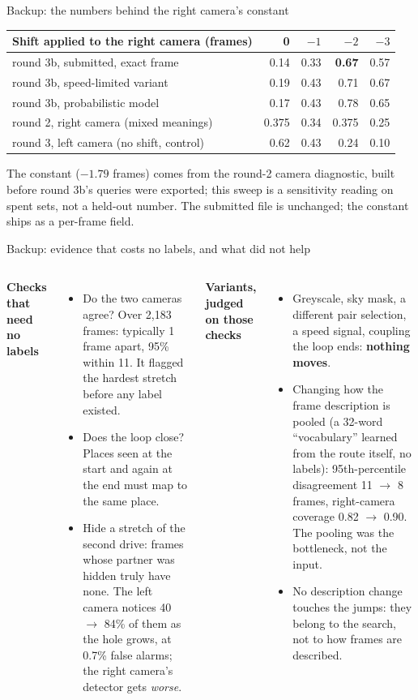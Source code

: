 \documentclass[10pt,aspectratio=169]{beamer}
\begin{document}
\begin{frame}{Backup: the numbers behind the right camera's constant}
\begin{center}\small
\begin{tabular}{lrrrr}
\toprule
Shift applied to the right camera (frames) & 0 & $-1$ & $-2$ & $-3$ \\
\midrule
round 3b, submitted, exact frame & 0.14 & 0.33 & \textbf{0.67} & 0.57 \\
round 3b, speed-limited variant & 0.19 & 0.43 & 0.71 & 0.67 \\
round 3b, probabilistic model & 0.17 & 0.43 & 0.78 & 0.65 \\
round 2, right camera (mixed meanings) & 0.375 & 0.34 & 0.375 & 0.25 \\
round 3, left camera (no shift, control) & 0.62 & 0.43 & 0.24 & 0.10 \\
\bottomrule
\end{tabular}
\end{center}
The constant ($-1.79$ frames) comes from the round-2 camera diagnostic, built before round 3b's queries were exported; this sweep is a sensitivity reading on spent sets, not a held-out number. The submitted file is unchanged; the constant ships as a per-frame field.
\end{frame}

\begin{frame}{Backup: evidence that costs no labels, and what did not help}
\begin{columns}[T]
\textbf{Checks that need no labels}
\begin{itemize}
  \item Do the two cameras agree? Over 2,183 frames: typically 1 frame apart, 95\% within 11. It flagged the hardest stretch before any label existed.
  \item Does the loop close? Places seen at the start and again at the end must map to the same place.
  \item Hide a stretch of the second drive: frames whose partner was hidden truly have none. The left camera notices 40 $\to$ 84\% of them as the hole grows, at 0.7\% false alarms; the right camera's detector gets \emph{worse}.
\end{itemize}
\textbf{Variants, judged on those checks}
\begin{itemize}
  \item Greyscale, sky mask, a different pair selection, a speed signal, coupling the loop ends: \textbf{nothing moves}.
  \item Changing how the frame description is pooled (a 32-word ``vocabulary'' learned from the route itself, no labels): 95th-percentile disagreement 11 $\to$ 8 frames, right-camera coverage 0.82 $\to$ 0.90. The pooling was the bottleneck, not the input.
  \item No description change touches the jumps: they belong to the search, not to how frames are described.
\end{itemize}
\end{columns}
\end{frame}
\end{document}
